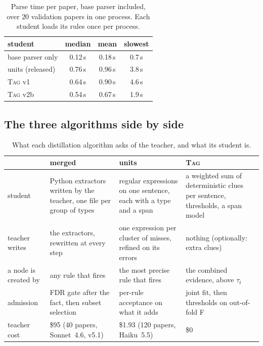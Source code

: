 \documentclass[10pt]{article}
\newcommand{\tagger}{\textsc{Tag}}
\begin{document}
\begin{table}[h]
\centering\small
\caption{Parse time per paper, base parser included, over $20$ validation papers in one process. Each student loads its rules once per process.}
\label{tab:tagger-time}
\begin{tabular}{@{}lccc@{}}
\toprule
\textbf{student} & \textbf{median} & \textbf{mean} & \textbf{slowest} \\
\midrule
base parser only & 0.12\,s & 0.18\,s & 0.7\,s \\
units (released) & 0.76\,s & 0.96\,s & 3.8\,s \\
\tagger{} v1 & 0.64\,s & 0.90\,s & 4.6\,s \\
\tagger{} v2b & 0.54\,s & 0.67\,s & 1.9\,s \\
\bottomrule
\end{tabular}
\end{table}

\FloatBarrier
\subsection{The three algorithms side by side}

\begin{table}[h!]
\centering\small
\caption{What each distillation algorithm asks of the teacher, and what its student is.}
\label{tab:three}
\begin{tabular}{@{}p{2.3cm}p{3.7cm}p{3.7cm}p{3.7cm}@{}}
\toprule
& \textbf{merged} & \textbf{units} & \textbf{\tagger{}} \\
\midrule
student & Python extractors written by the teacher, one file per group of types & regular expressions on one sentence, each with a type and a span & a weighted sum of deterministic clues per sentence, thresholds, a span model \\[3pt]
teacher writes & the extractors, rewritten at every step & one expression per cluster of misses, refined on its errors & nothing (optionally: extra clues) \\[3pt]
a node is created by & any rule that fires & the most precise rule that fires & the combined evidence, above $\tau_t$ \\[3pt]
admission & FDR gate after the fact, then subset selection & per-rule acceptance on what it adds & joint fit, then thresholds on out-of-fold F \\[3pt]
teacher cost & \$95 (40 papers, Sonnet~4.6, v5.1) & \$1.93 (120 papers, Haiku~5.5) & \$0 \\
\bottomrule
\end{tabular}
\end{table}
\end{document}
